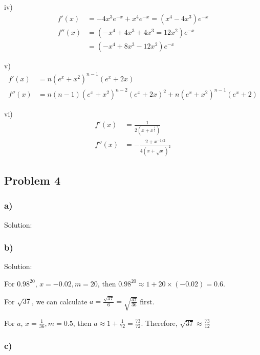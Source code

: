 \documentclass[letterpaper, 11pt]{article}
\newcommand{\1}{\mathds{1}}	%
\theoremstyle{definition}
\begin{document}
  iv)
  \begin{align*}
    f'(x)  & = -4x ^{3} e ^{-x} + x ^{4} e ^{-x} = (x ^{4} - 4x ^{3})e ^{-x} \\
    f''(x) & =(-x ^{4} +4x ^{3} +4x ^{3} =12 x ^{2})e ^{-x}                  \\
           & = (-x ^{4} + 8 x ^{3}- 12 x ^{2}) e ^{-x}
  \end{align*}

  v)
  \begin{align*}
    f'(x)  & = n(e ^{x} + x ^{2}) ^{n - 1} (e ^{x} + 2x)                                                    \\
    f''(x) & = n(n-1)(e ^{x} + x ^{2}) ^{n - 2} (e ^{x} + 2x)^{2} +n(e ^{x} + x ^{2}) ^{n - 1} (e ^{x} + 2)
  \end{align*}

  vi)
  \begin{align*}
    f'(x)  & = \frac{1}{2(x + x ^{\frac{1}{2}})}        \\
    f''(x) & = -\frac{2 + x ^{-1/2}}{4(x + \sqrt{x})^2}
  \end{align*}

  \subsection*{Problem 4}

  \subsubsection*{a)}

  Solution:

  \subsubsection*{b)}

  Solution:

  For $0.98 ^{20}$, $ x = -0.02, m = 20$, then $0.98 ^{20} \approx 1 + 20 \times (-0.02) = 0.6 $.

  For $\sqrt{37}$, we can calculate $a = \frac{\sqrt{37}}{6} = \sqrt{\frac{37}{36}}$ first.

  For $a$, $x = \frac{1}{36}, m = 0.5$, then $a \approx 1 + \frac{1}{72} = \frac{73}{72}$. Therefore, $\sqrt{37} \approx \frac{73}{12}$

  \subsubsection*{c)}
\end{document}
